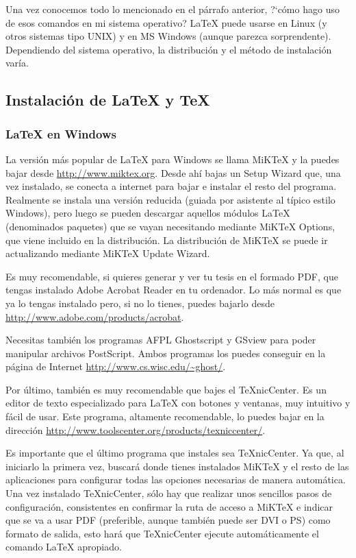 	Una vez conocemos todo lo mencionado en el p\'arrafo anterior, ?`c\'omo hago uso de esos comandos en mi sistema operativo? 					\LaTeX{} puede usarse en Linux (y otros sistemas tipo UNIX) y en MS Windows (aunque parezca sorprendente). 
	Dependiendo del sistema operativo, la distribuci\'on y el m\'etodo de instalaci\'on var\'ia.
	
		\subsection{Instalaci\'on de \LaTeX{} y \TeX{}}
	
				\subsubsection{\LaTeX{} en Windows} %
				La versi\'on m\'as popular de \LaTeX{} para Windows se llama MiK\TeX{} y la puedes bajar desde 
				\url{http://www.miktex.org}. Desde ah\'i bajas un Setup Wizard que, una vez instalado, se conecta a internet 
				para bajar e instalar el resto del programa. Realmente se instala una versi\'on reducida (guiada por asistente 
				al t\'ipico estilo Windows), pero luego se pueden descargar aquellos m\'odulos LaTeX (denominados paquetes) que 
				se vayan necesitando mediante MiK\TeX{} Options, que viene incluido en la distribuci\'on. La distribuci\'on 
				de MiK\TeX{} se puede ir actualizando mediante MiK\TeX{} Update Wizard.
	
				Es muy recomendable, si quieres generar y ver tu tesis en el formado PDF, que tengas instalado 
				Adobe Acrobat Reader en tu ordenador. Lo m\'as normal es que ya lo tengas instalado pero, si no lo tienes, 
				puedes bajarlo desde \url{http://www.adobe.com/products/acrobat}.
	
				Necesitas tambi\'en los programas AFPL Ghostscript y GSview para poder manipular archivos PostScript. 
				Ambos programas los puedes conseguir en la p\'agina de Internet \url{http://www.cs.wisc.edu/~ghost/}.

				Por \'ultimo, tambi\'en es muy recomendable que bajes el \TeX{}nicCenter. Es un editor de texto especializado 
				para \LaTeX{} con botones y ventanas, muy intuitivo y f\'acil de usar. Este programa, altamente recomendable, 
				lo puedes bajar en la direcci\'on \url{http://www.toolscenter.org/products/texniccenter/}.

				Es importante que el \'ultimo programa que instales sea \TeX{}nicCenter. Ya que, al iniciarlo la primera vez, 
				buscar\'a donde tienes instalados MiK\TeX{} y el resto de las aplicaciones para configurar todas las opciones 
				necesarias de manera autom\'atica. Una vez instalado \TeX{}nicCenter, s\'olo hay que realizar unos sencillos pasos 
				de configuraci\'on, consistentes en confirmar la ruta de acceso a MiK\TeX{} e indicar que se va a usar
				PDF (preferible, aunque tambi\'en puede ser DVI o PS) como formato de salida, esto har\'a que \TeX{}nicCenter 
				ejecute autom\'aticamente el comando \LaTeX{} apropiado.
			
